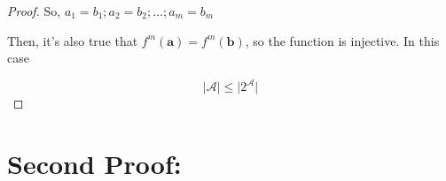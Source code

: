 \documentclass[12pt]{article}
\renewcommand{\vec}[1]{\boldsymbol{#1}}
\begin{document}
\begin{proof}
    \vspace*{0.3cm}
    \hspace*{1cm}
    So, $ a_1 = b_1; a_2 = b_2; \ldots; a_m = b_m $

    \vspace*{0.3cm}
    \hspace*{1cm}
    Then, it's also true that $ f^m(\vec a) = f^m(\vec b)$, so the function is injective. In this case

    \[ \vert \mathcal{A} \vert \leq \vert 2^{\mathcal{A}} \vert \]

\end{proof}

\section*{Second Proof:}
\end{document}
